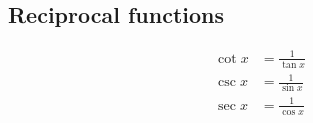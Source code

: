 \subsection*{Reciprocal functions}

\begin{align*}
  \cot x &= \frac{1}{\tan x}\\
  \csc x &= \frac{1}{\sin x}\\
  \sec x &= \frac{1}{\cos x}
\end{align*}